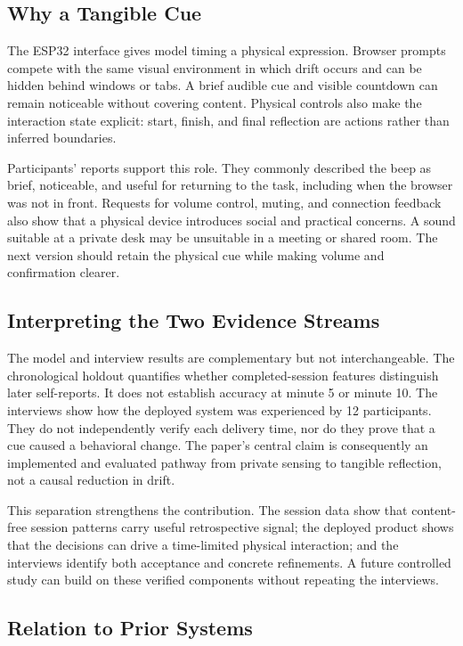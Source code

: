 \documentclass[12pt,a4paper]{article}
\begin{document}
\subsection{Why a Tangible Cue}

The ESP32 interface gives model timing a physical expression. Browser prompts compete with the same visual environment in which drift occurs and can be hidden behind windows or tabs. A brief audible cue and visible countdown can remain noticeable without covering content. Physical controls also make the interaction state explicit: start, finish, and final reflection are actions rather than inferred boundaries.

Participants' reports support this role. They commonly described the beep as brief, noticeable, and useful for returning to the task, including when the browser was not in front. Requests for volume control, muting, and connection feedback also show that a physical device introduces social and practical concerns. A sound suitable at a private desk may be unsuitable in a meeting or shared room. The next version should retain the physical cue while making volume and confirmation clearer.

\subsection{Interpreting the Two Evidence Streams}

The model and interview results are complementary but not interchangeable. The chronological holdout quantifies whether completed-session features distinguish later self-reports. It does not establish accuracy at minute 5 or minute 10. The interviews show how the deployed system was experienced by 12 participants. They do not independently verify each delivery time, nor do they prove that a cue caused a behavioral change. The paper's central claim is consequently an implemented and evaluated pathway from private sensing to tangible reflection, not a causal reduction in drift.

This separation strengthens the contribution. The session data show that content-free session patterns carry useful retrospective signal; the deployed product shows that the decisions can drive a time-limited physical interaction; and the interviews identify both acceptance and concrete refinements. A future controlled study can build on these verified components without repeating the interviews.

\subsection{Relation to Prior Systems}
\end{document}
